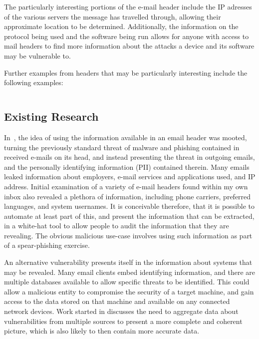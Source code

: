 The particularly interesting portions of the e-mail header include the IP
adresses of the various servers the message has travelled through, allowing
their approximate location to be determined.  Additionally, the information on
the protocol being used and the software being run allows for anyone with access
to mail headers to find more information about the attacks a device and its
software may be vulnerable to.

Further examples from headers that may be particularly interesting include the following examples:

\begin{lstlisting}

\end{lstlisting}

\subsection{Existing Research}

In~\cite{nurse2015investigating}, the idea of using the information available
in an email header was mooted, turning the previously standard threat of
malware and phishing contained in received e-mails on its head, and instead
presenting the threat in outgoing emails, and the personally identifying
information (PII) contained therein.  Many emails leaked information about
employers, e-mail services and applications used, and IP address.  Initial
examination of a variety of e-mail headers found within my own inbox also
revealed a plethora of information, including phone carriers, preferred
languages, and system usernames.  It is conceivable therefore, that it is
possible to automate at least part of this, and present the information that
can be extracted, in a white-hat tool to allow people to audit the information
that they are revealing.  The obvious malicious use-case involves using such
information as part of a spear-phishing exercise.

An alternative vulnerability presents itself in the information about systems
that may be revealed.  Many email clients embed identifying information, and
there are multiple databases available to allow specific threats to be
identified.  This could allow a malicious entity to compromise the security of
a target machine, and gain access to the data stored on that machine and
available on any connected network devices.  Work started in
\cite{joshi2013extracting} discusses the need to aggregate data about
vulnerabilities from multiple sources to present a more complete and coherent
picture, which is also likely to then contain more accurate data.

